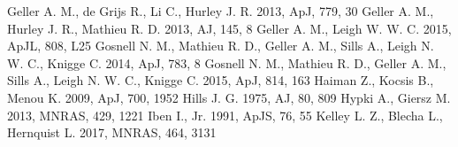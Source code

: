 \documentclass{aastex62}
\begin{document}
\begin{thebibliography}{}
 Geller A. M.,
de Grijs R., Li C., Hurley J. R. 2013, ApJ, 779, 30
 Geller A. M., Hurley J. R., Mathieu R. D. 2013, AJ, 145, 8
 Geller A. M., Leigh W. W. C. 2015, ApJL, 808, L25 
 Gosnell N. M., Mathieu R. D., Geller A. M., Sills A., Leigh N. W. C., Knigge C. 2014, ApJ, 783, 8
 Gosnell N. M., Mathieu R. D., Geller A. M., Sills A., Leigh N. W. C., Knigge C. 2015, ApJ, 814, 163
 Haiman Z., Kocsis B., Menou K. 2009, ApJ, 700, 1952  
 Hills J. G. 1975, AJ, 80, 809
 Hypki A., Giersz M. 2013,
MNRAS, 429, 1221
  Iben I., Jr. 1991, ApJS, 76, 55
 Kelley L. Z., Blecha L., Hernquist L. 2017, MNRAS, 464, 3131 

\end{thebibliography}
\end{document}
